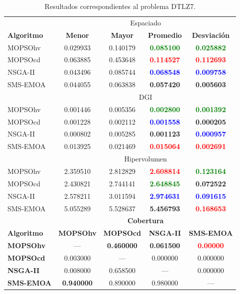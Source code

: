  \begin{table}
 \begin{center}
 \begin{tabular}{|l|cc|cc|} \hline
    & \multicolumn{4}{|c|}{Espaciado} \\ 
	\textbf{Algoritmo} & \textbf{Menor} & \textbf{Mayor} & \textbf{Promedio} & \textbf{Desviaci\'on} \\  \hline \hline
	MOPSOhv &0.029933 & 0.140179 &  \textbf{\textcolor{green}{0.085100}} &  \textbf{\textcolor{green}{0.025882}}    \\ 
	MOPSOcd & 0.063885 & 0.453648 &  \textbf{\textcolor{red}{0.114527}} & \textbf{\textcolor{red}{0.112693}}   \\ 
	NSGA-II &0.043496 & 0.085744 &  \textbf{\textcolor{blue}{0.068548}} & \textbf{\textcolor{blue}{0.009758}}  \\  
	SMS-EMOA &0.044055 & 0.063838 & \textbf{0.057420} &  \textbf{0.005603}    \\  
	\hline
    & \multicolumn{4}{|c|}{DGI} \\ 
	\hline\hline
	MOPSOhv &0.001446 & 0.005356 &  \textbf{\textcolor{green}{0.002800}} & \textbf{\textcolor{green}{ 0.001392}}   \\ 
	MOPSOcd & 0.001228 & 0.002112 & \textbf{\textcolor{blue}{0.001558}} &  \textbf{0.000205 }  \\ 
	NSGA-II & 0.000802 & 0.005285 & \textbf{0.001123} &  \textbf{\textcolor{blue}{0.000957}}  \\  
	SMS-EMOA &0.013925 & 0.021469 &  \textbf{\textcolor{red}{0.015064}} & \textbf{\textcolor{red}{ 0.002691}}  \\  
	\hline\hline
    & \multicolumn{4}{|c|}{Hipervolumen} \\ 
	\hline\hline
	MOPSOhv & 2.359510 & 2.812829 &  \textbf{\textcolor{red}{2.608814 }}&  \textbf{\textcolor{green}{0.123164}}  \\ 
	MOPSOcd & 2.430821 & 2.744141 &  \textbf{\textcolor{green}{2.648845 }}&  \textbf{0.072522}   \\ 
	NSGA-II & 2.578211 & 3.011594 &  \textbf{\textcolor{blue}{2.974631 }}&  \textbf{\textcolor{blue}{0.091615}}   \\  
	SMS-EMOA &5.055289 & 5.528637 & \textbf{5.456793} &  \textbf{\textcolor{red}{0.168653}}   \\  
	\hline\hline	
	& \multicolumn{4}{|c|}{\textbf{Cobertura}} \\ \hline\hline 
	\textbf{Algoritmo} & \textbf{MOPSOhv} & \textbf{MOPSOcd} & \textbf{NSGA-II} & \textbf{SMS-EMOA} \\  \hline \hline
	\textbf{MOPSOhv} &---       & \textbf{0.460000}   & \textbf{0.061500} &   \textbf{\textcolor{red}{0.00000}}	 \\ 
	\textbf{MOPSOcd} & 0.003000 & ---       &  0.000000  & 0.000000 \\ 
	\textbf{NSGA-II} & 0.008000 & 0.658500  & ---      &  0.000000    \\  
	\textbf{SMS-EMOA}& \textbf{0.940000} & 0.890000  & 0.980000 & --- \\  
	\hline	
	\end{tabular}
\caption{Resultados correspondientes al problema DTLZ7.}
  \label{tab:dtlz7}
\end{center}
\end{table}
